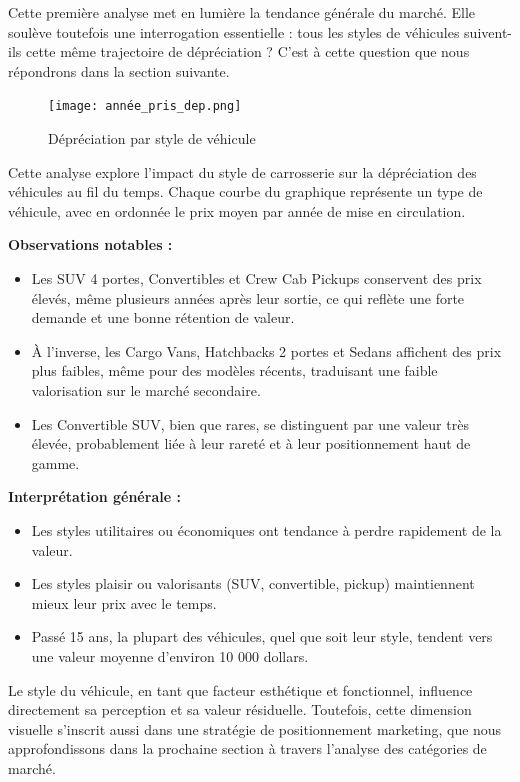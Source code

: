 \documentclass[12pt]{report}
\begin{document}
\vspace{1em}
Cette première analyse met en lumière la tendance générale du marché. Elle soulève toutefois une interrogation essentielle : tous les styles de véhicules suivent-ils cette même trajectoire de dépréciation ? C’est à cette question que nous répondrons dans la section suivante.


\begin{figure}[H]
    \centering
    \texttt{[image: année\_pris\_dep.png]}
    \caption{Dépréciation par style de véhicule}
    \label{fig:annee-pris-dep}  
\end{figure}

Cette analyse explore l’impact du style de carrosserie sur la dépréciation des véhicules au fil du temps. Chaque courbe du graphique représente un type de véhicule, avec en ordonnée le prix moyen par année de mise en circulation.

\vspace{0.5em}
\textbf{Observations notables :}
\begin{itemize}
    \item Les SUV 4 portes, Convertibles et Crew Cab Pickups conservent des prix élevés, même plusieurs années après leur sortie, ce qui reflète une forte demande et une bonne rétention de valeur.
    \item À l’inverse, les Cargo Vans, Hatchbacks 2 portes et Sedans affichent des prix plus faibles, même pour des modèles récents, traduisant une faible valorisation sur le marché secondaire.
    \item Les Convertible SUV, bien que rares, se distinguent par une valeur très élevée, probablement liée à leur rareté et à leur positionnement haut de gamme.
\end{itemize}

\vspace{0.5em}
\textbf{Interprétation générale :}
\begin{itemize}
    \item Les styles utilitaires ou économiques ont tendance à perdre rapidement de la valeur.
    \item Les styles plaisir ou valorisants (SUV, convertible, pickup) maintiennent mieux leur prix avec le temps.
    \item Passé 15 ans, la plupart des véhicules, quel que soit leur style, tendent vers une valeur moyenne d’environ 10 000 dollars.
\end{itemize}

\vspace{1em}
Le style du véhicule, en tant que facteur esthétique et fonctionnel, influence directement sa perception et sa valeur résiduelle. Toutefois, cette dimension visuelle s’inscrit aussi dans une stratégie de positionnement marketing, que nous approfondissons dans la prochaine section à travers l’analyse des catégories de marché.
\end{document}
